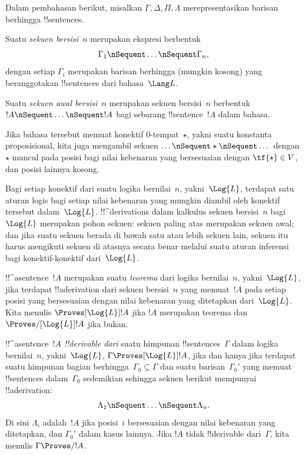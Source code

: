 \documentclass[../../../include/open-logic-section]{subfiles}
\begin{document}


Dalam pembahasan berikut, misalkan $\Gamma,\Delta,\Pi,\Lambda$
merepresentasikan barisan berhingga !!{sentence}s.

\begin{defn}[Sekuen]
Suatu \emph{sekuen bersisi~$n$} merupakan ekspresi berbentuk
\[
\Gamma_1 \nSequent \dots \nSequent \Gamma_n,
\]
dengan setiap $\Gamma_i$ merupakan barisan berhingga (mungkin kosong) yang
beranggotakan !!{sentence}s dari bahasa~$\Lang L$.
\end{defn}

\begin{defn}
Suatu \emph{sekuen awal bersisi~$n$} merupakan sekuen bersisi~$n$ berbentuk
$!A\nSequent\dots\nSequent !A$ bagi sebarang !!{sentence}~$!A$ dalam bahasa.

Jika bahasa tersebut memuat konektif $0$-tempat~$\star$, yakni suatu konstanta
proposisional, kita juga mengambil sekuen $\dots\nSequent\star\nSequent\dots$
dengan $\star$ muncul pada posisi bagi nilai kebenaran yang bersesuaian dengan
$\tf{\star}\in V$, dan posisi lainnya kosong.
\end{defn}

Bagi setiap konektif dari suatu logika bernilai~$n$, yakni~$\Log{L}$, terdapat
satu aturan logis bagi setiap nilai kebenaran yang mungkin diambil oleh
konektif tersebut dalam~$\Log{L}$. !!^{derivation}s dalam kalkulus sekuen
bersisi~$n$ bagi~$\Log{L}$ merupakan pohon sekuen: sekuen paling atas
merupakan sekuen awal; dan jika suatu sekuen berada di bawah satu atau lebih
sekuen lain, sekuen itu harus mengikuti sekuen di atasnya secara benar melalui
suatu aturan inferensi bagi konektif-konektif dari~$\Log{L}$.

\begin{defn}[Teorema]
!!^a{sentence}~$!A$ merupakan suatu \emph{teorema} dari logika
bernilai~$n$, yakni~$\Log{L}$, jika terdapat !!a{derivation} dari sekuen
bersisi~$n$ yang memuat~$!A$ pada setiap posisi yang bersesuaian dengan nilai
kebenaran yang ditetapkan dari~$\Log{L}$. Kita menulis
$\Proves[\Log{L}]!A$ jika $!A$ merupakan teorema dan
$\Proves/[\Log{L}]!A$ jika bukan.
\end{defn}

\begin{defn}[!!^{derivability}]
!!^a{sentence}~$!A$ \emph{!!{derivable} dari} suatu himpunan
!!{sentence}s~$\Gamma$ dalam logika bernilai~$n$, yakni~$\Log{L}$,
$\Gamma\Proves[\Log{L}]!A$, jika dan hanya jika terdapat suatu himpunan
bagian berhingga~$\Gamma_0\subseteq\Gamma$ dan suatu barisan~$\Gamma_0'$ yang
memuat !!{sentence}s dalam~$\Gamma_0$ sedemikian sehingga sekuen berikut
mempunyai !!a{derivation}:
\[
\Lambda_1\nSequent\dots\nSequent\Lambda_n.
\]
Di sini $\Lambda_i$ adalah~$!A$ jika posisi~$i$ bersesuaian dengan nilai
kebenaran yang ditetapkan, dan $\Gamma_0'$ dalam kasus lainnya. Jika $!A$
tidak !!{derivable} dari~$\Gamma$, kita menulis $\Gamma\Proves/ !A$.
\end{defn}
\end{document}

